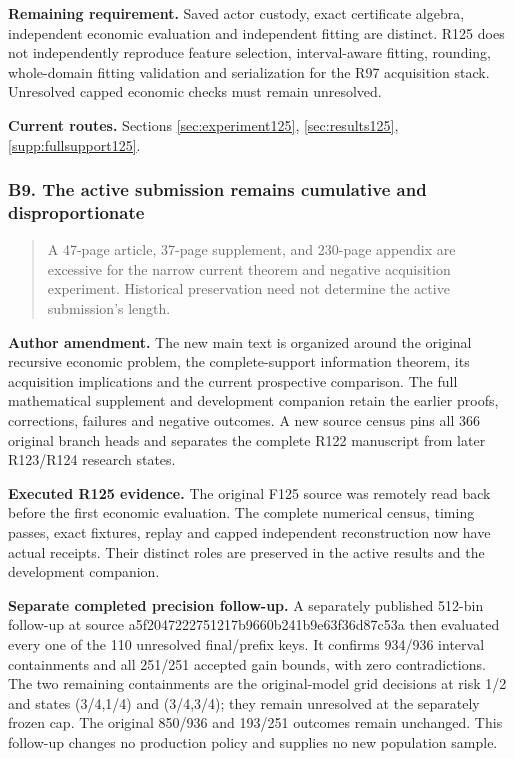 \noindent\textbf{Remaining requirement.} Saved actor custody, exact certificate algebra, independent economic evaluation and independent fitting are distinct. R125 does not independently reproduce feature selection, interval-aware fitting, rounding, whole-domain fitting validation and serialization for the R97 acquisition stack. Unresolved capped economic checks must remain unresolved.

\noindent\textbf{Current routes.} Sections \ref{sec:experiment125}, \ref{sec:results125}, \ref{supp:fullsupport125}.

\subsubsection{B9. The active submission remains cumulative and disproportionate}

\begin{quote}\small
A 47-page article, 37-page supplement, and 230-page appendix are excessive for the narrow current theorem and negative acquisition experiment. Historical preservation need not determine the active submission's length.
\end{quote}

\noindent\textbf{Author amendment.} The new main text is organized around the original recursive economic problem, the complete-support information theorem, its acquisition implications and the current prospective comparison. The full mathematical supplement and development companion retain the earlier proofs, corrections, failures and negative outcomes. A new source census pins all 366 original branch heads and separates the complete R122 manuscript from later R123/R124 research states.

\noindent\textbf{Executed R125 evidence.} The original F125 source was remotely read back before the first economic evaluation. The complete numerical census, timing passes, exact fixtures, replay and capped independent reconstruction now have actual receipts. Their distinct roles are preserved in the active results and the development companion.

\noindent\textbf{Separate completed precision follow-up.} A separately published 512-bin follow-up at source a5f2047222751217b9660b241b9e63f36d87c53a then evaluated every one of the 110 unresolved final/prefix keys. It confirms 934/936 interval containments and all 251/251 accepted gain bounds, with zero contradictions. The two remaining containments are the original-model grid decisions at risk 1/2 and states (3/4,1/4) and (3/4,3/4); they remain unresolved at the separately frozen cap. The original 850/936 and 193/251 outcomes remain unchanged. This follow-up changes no production policy and supplies no new population sample.

